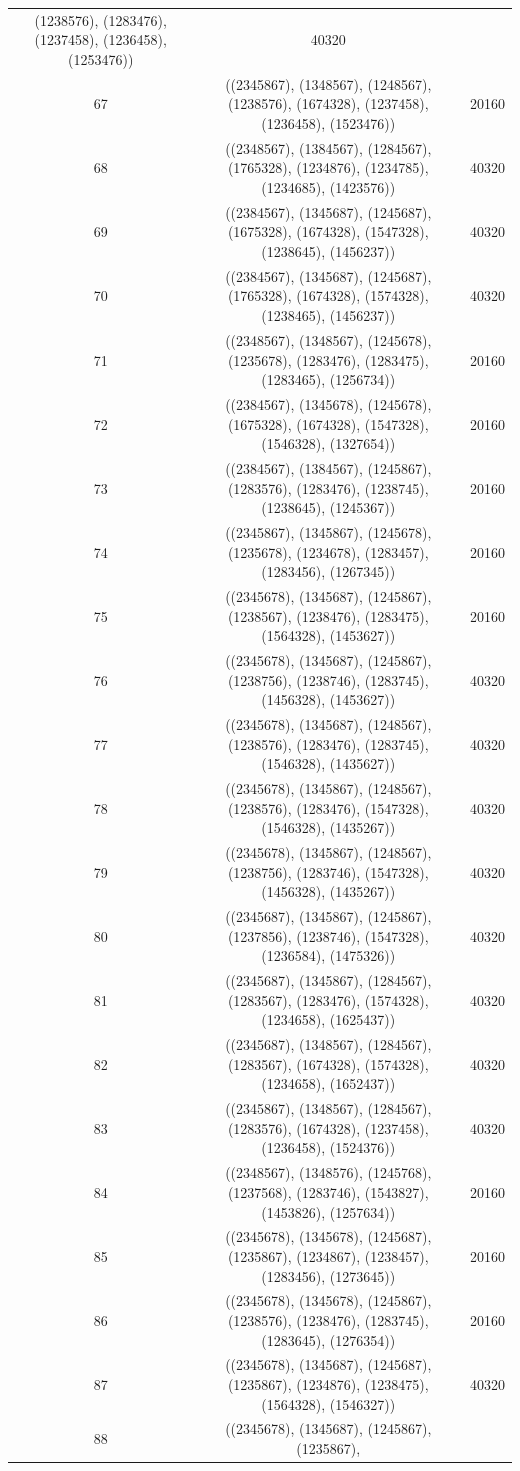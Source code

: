 \documentclass[pdftex]{sigma}
\theoremstyle{definition}
\numberwithin{equation}{section}
\begin{document}
\begin{center}
\begin{longtable}{|@{\,}c@{\,}|@{\,}c@{\,}|@{\,}c@{\,}|}
(1238576), (1283476), (1237458), (1236458), (1253476)) & 40320 \\ 67 & ((2345867), (1348567), (1248567), (1238576), (1674328), (1237458), (1236458), (1523476)) & 20160 \\ 68 & ((2348567), (1384567), (1284567), (1765328), (1234876), (1234785), (1234685), (1423576)) & 40320 \\ 69 & ((2384567), (1345687), (1245687), (1675328), (1674328), (1547328), (1238645), (1456237)) & 40320 \\ 70 & ((2384567), (1345687), (1245687), (1765328), (1674328), (1574328), (1238465), (1456237)) & 40320 \\ 71 & ((2348567), (1348567), (1245678), (1235678), (1283476), (1283475), (1283465), (1256734)) & 20160 \\ 72 & ((2384567), (1345678), (1245678), (1675328), (1674328), (1547328), (1546328), (1327654)) & 20160 \\ 73 & ((2384567), (1384567), (1245867), (1283576), (1283476), (1238745), (1238645), (1245367)) & 20160 \\ 74 & ((2345867), (1345867), (1245678), (1235678), (1234678), (1283457), (1283456), (1267345)) & 20160 \\ 75 & ((2345678), (1345687), (1245867), (1238567), (1238476), (1283475), (1564328), (1453627)) & 20160 \\ 76 & ((2345678), (1345687), (1245867), (1238756), (1238746), (1283745), (1456328), (1453627)) & 40320 \\ 77 & ((2345678), (1345687), (1248567), (1238576), (1283476), (1283745), (1546328), (1435627)) & 40320 \\ 78 & ((2345678), (1345867), (1248567), (1238576), (1283476), (1547328), (1546328), (1435267)) & 40320 \\ 79 & ((2345678), (1345867), (1248567), (1238756), (1283746), (1547328), (1456328), (1435267)) & 40320 \\ 80 & ((2345687), (1345867), (1245867), (1237856), (1238746), (1547328), (1236584), (1475326)) & 40320 \\ 81 & ((2345687), (1345867), (1284567), (1283567), (1283476), (1574328), (1234658), (1625437)) & 40320 \\ 82 & ((2345687), (1348567), (1284567), (1283567), (1674328), (1574328), (1234658), (1652437)) & 40320 \\ 83 & ((2345867), (1348567), (1284567), (1283576), (1674328), (1237458), (1236458), (1524376)) & 40320 \\ 84 & ((2348567), (1348576), (1245768), (1237568), (1283746), (1543827), (1453826), (1257634)) & 20160 \\ 85 & ((2345678), (1345678), (1245687), (1235867), (1234867), (1238457), (1283456), (1273645)) & 20160 \\ 86 & ((2345678), (1345678), (1245867), (1238576), (1238476), (1283745), (1283645), (1276354)) & 20160 \\ 87 & ((2345678), (1345687), (1245687), (1235867), (1234876), (1238475), (1564328), (1546327)) & 40320 \\ 88 & ((2345678), (1345687), (1245867), (1235867), 
\end{longtable}
\end{center}
\end{document}
